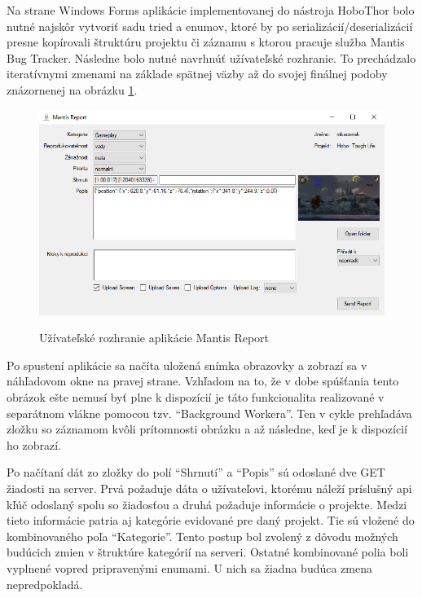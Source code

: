 \documentclass[slovak, bachelorpractice]{diploma}
\begin{document}
Na strane Windows Forms aplikácie implementovanej do nástroja HoboThor bolo nutné najskôr vytvoriť sadu tried a enumov, ktoré by po serializácií/deserializácií presne kopírovali štruktúru projektu či záznamu s ktorou pracuje služba Mantis Bug Tracker. Následne bolo nutné navrhnúť užívateľské rozhranie. To prechádzalo iteratívnymi zmenami na základe spätnej väzby až do svojej finálnej podoby znázornenej na obrázku \ref{pic:Report}.

\begin{figure}[!htbp]
	\centering
	\mybox{} {
		\includegraphics[width=.98\textwidth]{Pictures/report.png}
	}
	\caption{Užívateľské rozhranie aplikácie Mantis Report}
	\label{pic:Report}
\end{figure}

Po spustení aplikácie sa načíta uložená snímka obrazovky a zobrazí sa v náhľadovom okne na pravej strane. Vzhľadom na to, že v dobe spúšťania tento obrázok ešte nemusí byť plne k dispozícií je táto funkcionalita realizované v separátnom vlákne pomocou tzv. \enquote{Background Workera}. Ten v cykle prehľadáva zložku so záznamom kvôli prítomnosti obrázku a až následne, keď je k dispozícií ho zobrazí.

Po načítaní dát zo zložky do polí \enquote{Shrnutí} a \enquote{Popis} sú odoslané dve GET žiadosti na server. Prvá požaduje dáta o užívateľovi, ktorému náleží príslušný api kľúč odoslaný spolu so žiadosťou a druhá požaduje informácie o projekte. Medzi tieto informácie patria aj kategórie evidované pre daný projekt. Tie sú vložené do kombinovaného poľa \enquote{Kategorie}. Tento postup bol zvolený z dôvodu možných budúcich zmien v štruktúre kategórií na serveri. Ostatné kombinované polia boli vyplnené vopred pripravenými enumami. U nich sa žiadna budúca zmena nepredpokladá.
\end{document}
